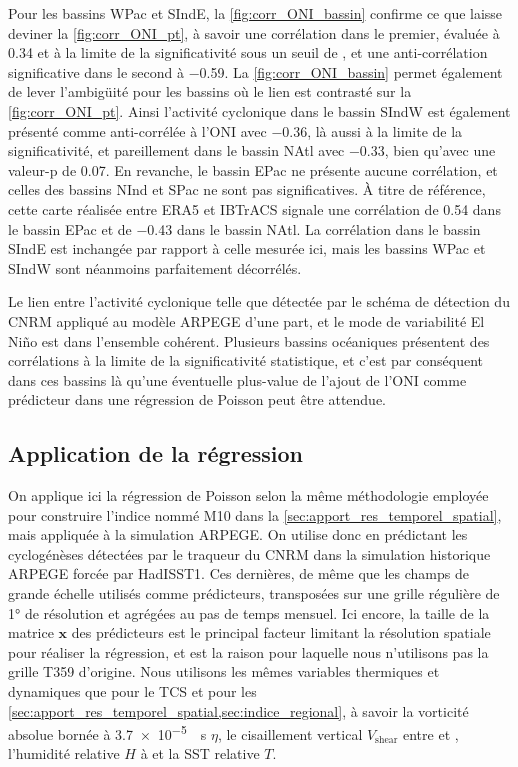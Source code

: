 \documentclass[../main.tex]{subfiles}
\begin{document}
Pour les bassins WPac et SIndE, la \cref{fig:corr_ONI_bassin} confirme ce que laisse deviner la \cref{fig:corr_ONI_pt}, à savoir une corrélation dans le
premier, évaluée à \num{0.34} et à la limite de la significativité sous un seuil de , et une anti-corrélation significative dans le second à
\num{-0.59}. La \cref{fig:corr_ONI_bassin} permet également de lever l'ambigüité pour les bassins où le lien est contrasté sur la \cref{fig:corr_ONI_pt}. Ainsi
l'activité cyclonique dans le bassin SIndW est également présenté comme anti-corrélée à l'ONI avec \num{-0.36}, là aussi à la limite de la significativité, et
pareillement dans le bassin NAtl avec \num{-0.33}, bien qu'avec une valeur-p de \num{0.07}. En revanche, le bassin EPac ne présente aucune corrélation, et
celles des bassins NInd et SPac ne sont pas significatives. À titre de référence, cette carte réalisée entre ERA5 et IBTrACS signale une corrélation de
\num{0.54} dans le bassin EPac et de \num{-0.43} dans le bassin NAtl. La corrélation dans le bassin SIndE est inchangée par rapport à celle mesurée ici, mais
les bassins WPac et SIndW sont néanmoins parfaitement décorrélés.

Le lien entre l'activité cyclonique telle que détectée par le schéma de détection du CNRM appliqué au modèle ARPEGE d'une part, et le mode de variabilité El
Niño est dans l'ensemble cohérent. Plusieurs bassins océaniques présentent des corrélations à la limite de la significativité statistique, et c'est par
conséquent dans ces bassins là qu'une éventuelle plus-value de l'ajout de l'ONI comme prédicteur dans une régression de Poisson peut être attendue.

\subsection{Application de la régression}

On applique ici la régression de Poisson selon la même méthodologie employée pour construire l'indice nommé M10 dans la \cref{sec:apport_res_temporel_spatial},
mais appliquée à la simulation ARPEGE. On utilise donc en prédictant les cyclogénèses détectées par le traqueur du CNRM dans la simulation historique ARPEGE
forcée par HadISST1. Ces dernières, de même que les champs de grande échelle utilisés comme prédicteurs, transposées sur une grille régulière de \ang{1} de
résolution et agrégées au pas de temps mensuel. Ici encore, la taille de la matrice $\mathbf{x}$ des prédicteurs est le principal facteur limitant la résolution
spatiale pour réaliser la régression, et est la raison pour laquelle nous n'utilisons pas la grille T359 d'origine. Nous utilisons les mêmes variables
thermiques et dynamiques que pour le TCS et pour les \cref{sec:apport_res_temporel_spatial,sec:indice_regional}, à savoir la vorticité absolue bornée à
\SI{3.7e-5}{\per\second} $\eta$, le cisaillement vertical $V_{\mathrm{shear}}$ entre  et , l'humidité relative $H$ à  et la SST
relative $T$.
\end{document}
